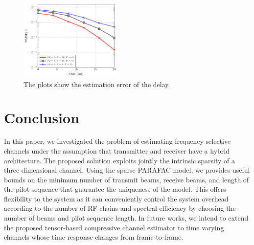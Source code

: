 \documentclass[conference]{IEEEtran}
\begin{document}
\begin{figure}[!t]
  \centering
  \includegraphics[width=0.45\textwidth]{fig/snr_delay}
  \vspace{-0.4cm}
  \caption{The plots show the estimation error of the delay.}
  \label{fig:delay_error}
\end{figure}

\section{Conclusion}
In this paper, we investigated the problem of estimating frequency selective
channels under the assumption that transmitter and receiver have a hybrid
architecture. The proposed solution exploits jointly the intrinsic sparsity of a
three dimensional channel. Using the sparse \gls{PARAFAC} model, we provides
useful bounds on the minimum
number of transmit beams,  receive beams, and length of the pilot sequence that
guarantee the uniqueness of the model. This offers  flexibility to the system
as it can conveniently control the system overhead according to the number of \gls{RF} chains and spectral efficiency by choosing the number of beams and pilot
sequence length. In future works, we intend to extend the proposed tensor-based
compressive channel estimator to time varying channels whose time response changes from frame-to-frame.

\newpage


\end{document}

